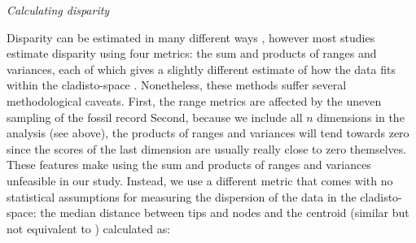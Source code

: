 \documentclass[12pt,letterpaper]{article}
\renewcommand{\subsection}[1]{%
\bigskip
\begin{center}
\begin{large}
\normalfont\itshape #1
\end{large}
\end{center}}
\begin{document}
\subsection{Calculating disparity}
Disparity can be estimated in many different ways \citep[e.g.][]{Wills1994,Ciampaglio2004,thorneresetting2011,hopkinsdecoupling2013,huang2015origins}, however most studies estimate disparity using four metrics: the sum and products of ranges and variances, each of which gives a slightly different estimate of how the data fits within the cladisto-space \citep{Foote01071994,Wills1994,brusatte50,Brusatte12092008,cisneros2010,thorneresetting2011,prentice2011,brusattedinosaur2012,toljagictriassic-jurassic2013,ruta2013,bentonmodels2014,bensonfaunal2014}.
%
Nonetheless, these methods suffer several methodological caveats.
First, the range metrics are affected by the uneven sampling of the fossil record \citep{Butler2012}
Second, because we include all $n$ dimensions in the analysis (see above), the products of ranges and variances will tend towards zero since the scores of the last dimension are usually really close to zero themselves. 
These features make using the sum and products of ranges and variances unfeasible in our study.
Instead, we use a different metric that comes with no statistical assumptions for measuring the dispersion of the data in the cladisto-space: the median distance between tips and nodes and the centroid (similar but not equivalent to \citealt{Wills1994,kornextinction2013,huang2015origins}) calculated as:
\end{document}
